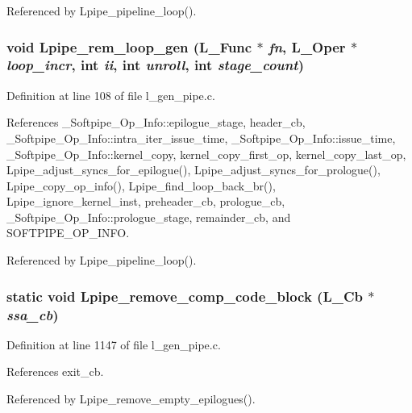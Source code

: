 Referenced by Lpipe\_\-pipeline\_\-loop().
\subsubsection{\setlength{\rightskip}{0pt plus 5cm}void Lpipe\_\-rem\_\-loop\_\-gen (L\_\-Func $\ast$ {\em fn}, L\_\-Oper $\ast$ {\em loop\_\-incr}, int {\em ii}, int {\em unroll}, int {\em stage\_\-count})}\label{l__gen__pipe_8c_cf8d2344c93cfbe701567693dc65e006}




Definition at line 108 of file l\_\-gen\_\-pipe.c.

References \_\-Softpipe\_\-Op\_\-Info::epilogue\_\-stage, header\_\-cb, \_\-Softpipe\_\-Op\_\-Info::intra\_\-iter\_\-issue\_\-time, \_\-Softpipe\_\-Op\_\-Info::issue\_\-time, \_\-Softpipe\_\-Op\_\-Info::kernel\_\-copy, kernel\_\-copy\_\-first\_\-op, kernel\_\-copy\_\-last\_\-op, Lpipe\_\-adjust\_\-syncs\_\-for\_\-epilogue(), Lpipe\_\-adjust\_\-syncs\_\-for\_\-prologue(), Lpipe\_\-copy\_\-op\_\-info(), Lpipe\_\-find\_\-loop\_\-back\_\-br(), Lpipe\_\-ignore\_\-kernel\_\-inst, preheader\_\-cb, prologue\_\-cb, \_\-Softpipe\_\-Op\_\-Info::prologue\_\-stage, remainder\_\-cb, and SOFTPIPE\_\-OP\_\-INFO.

Referenced by Lpipe\_\-pipeline\_\-loop().
\subsubsection{\setlength{\rightskip}{0pt plus 5cm}static void Lpipe\_\-remove\_\-comp\_\-code\_\-block (L\_\-Cb $\ast$ {\em ssa\_\-cb})\hspace{0.3cm}{\tt  [static]}}\label{l__gen__pipe_8c_adcda83dc0d7fe6f138348970f5fee5b}




Definition at line 1147 of file l\_\-gen\_\-pipe.c.

References exit\_\-cb.

Referenced by Lpipe\_\-remove\_\-empty\_\-epilogues().
